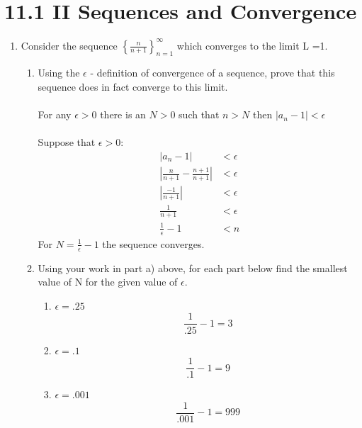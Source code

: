 \documentclass[12pt]{article}
\begin{document}
\newpage\section{11.1 II Sequences and Convergence}
\begin{enumerate}
    \item Consider the sequence $\left\{\frac{n}{n+1}\right\}_{n=1}^\infty$ which converges to the limit L =1.
    \begin{enumerate}
        \item Using the $\epsilon$ - definition of convergence of a sequence, prove that this sequence does in fact converge to this limit.
        \\\\ For any $\epsilon > 0$ there is an $N > 0$ such that $n > N$ then $|a_n-1| < \epsilon$\\
        \\Suppose that $\epsilon > 0$:
        \begin{align}
            |a_n-1| &< \epsilon\\
            \left|\frac{n}{n+1}-\frac{n+1}{n+1}\right| &< \epsilon\\
            \left|\frac{-1}{n+1}\right| &< \epsilon\\
            \frac{1}{n+1} &<\epsilon\\
            \frac{1}{\epsilon}-1 &<n
        \end{align}
        For $N = \frac{1}{\epsilon}-1$ the sequence converges. 
        \item Using your work in part a) above, for each part below find the smallest value of N for the given value of $\epsilon$.
        \begin{enumerate}
            \item $\epsilon=.25$
                \begin{equation*}
                    \frac{1}{.25}-1 = 3
                \end{equation*}
            \item $\epsilon=.1$
                \begin{equation*}
                    \frac{1}{.1}-1 = 9
                \end{equation*}
            \item $\epsilon=.001$
                \begin{equation*}
                    \frac{1}{.001}-1 = 999
                \end{equation*}
        \end{enumerate}
    \end{enumerate}
\end{enumerate}
    
\end{document}
